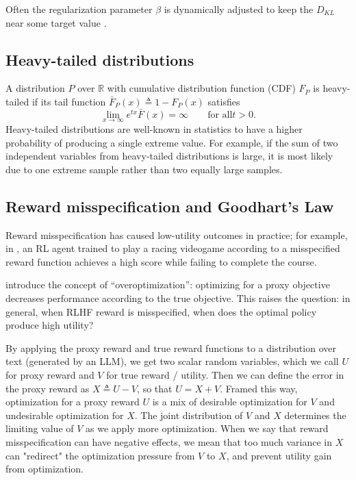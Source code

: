 \documentclass{article}
\begin{document}
Often the regularization parameter $\beta$ is dynamically adjusted to keep the $D_{KL}$ near some target value \citep{ziegler2020finetuning}.

\subsection{Heavy-tailed distributions}

A distribution $P$ over $\mathbb R$ with cumulative distribution function (CDF) $F_P$ is heavy-tailed if its tail function $\bar F_P(x) \triangleq 1 - F_P(x)$ satisfies 
\[
\lim _{x \rightarrow \infty} e^{t x} \bar{F}(x)=\infty \qquad \text{for all} t > 0.
\] 
Heavy-tailed distributions are well-known in statistics to have a higher probability of producing a single extreme value. For example, if the sum of two independent variables from heavy-tailed distributions is large, it is most likely due to one extreme sample rather than two equally large samples. \citep{wierman2013catastrophes}

\subsection{Reward misspecification and Goodhart's Law\label{sec:goodhart}}


Reward misspecification has caused low-utility outcomes in practice; for example, in \citep{ClarkAmodei2016}, an RL agent trained to play a racing videogame according to a misspecified reward function achieves a high score while failing to complete the course.

\citet{gao2023scaling} introduce the concept of ``overoptimization'': optimizing for a proxy objective decreases performance according to the true objective. This raises the question: in general, when RLHF reward is misspecified, when does the optimal policy produce high utility?

By applying the proxy reward and true reward functions to a distribution over text (generated by an LLM), we get two scalar random variables, which we call $U$ for proxy reward and $V$ for true reward / utility. Then we can define the error in the proxy reward as $X \triangleq U - V$, so that $U = X + V$. Framed this way, optimization for a proxy reward $U$ is a mix of desirable optimization for $V$ and undesirable optimization for $X$. The joint distribution of $V$ and $X$ determines the limiting value of $V$ as we apply more optimization. When we say that reward misspecification can have negative effects, we mean that too much variance in $X$ can "redirect" the optimization pressure from $V$ to $X$, and prevent utility gain from optimization.
\end{document}
